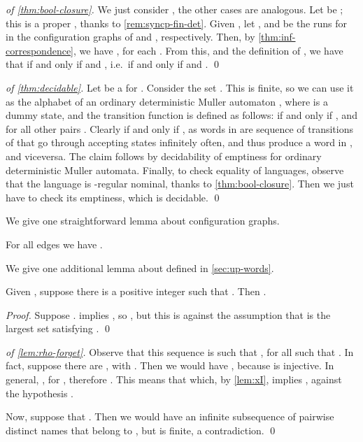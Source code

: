 \begin{proof}[of \cref{thm:bool-closure}]
We just consider , the other cases are analogous. Let  be ; this is a proper \hdma{}, thanks to \cref{rem:syncp-fin-det}. Given , let , and  be the runs for  in the configuration graphs of  and , respectively. Then, by \cref{thm:inf-correspondence}, we have , for each . From this, and the definition of , we have that  if and only if  and , i.e.\  if and only if  and .
\qed
\end{proof}
\begin{proof}[of \cref{thm:decidable}]
Let  be a \hdma{} for . Consider the set . This is finite, so we can use it as the alphabet of an ordinary deterministic Muller automaton , where  is a dummy state, and the transition function is defined as follows:  if and only if , and  for all other pairs . Clearly  if and only if , as words in  are sequence of transitions of  that go through accepting states infinitely often, and thus produce a word in , and viceversa. The claim follows by decidability of emptiness for ordinary deterministic Muller automata. Finally, to check equality of languages, observe that the language  is -regular nominal, thanks to \cref{thm:bool-closure}. Then we just have to check its emptiness, which is decidable.
\qed
\end{proof}
We give one straightforward lemma about configuration graphs.
\begin{lemma}
\label{lem:tr-names}
For all edges  we have .
\end{lemma}
We give one additional lemma about  defined in \cref{sec:up-words}.
\begin{lemma}
\label{lem:xI}
Given , suppose there is a positive integer  such that . Then .
\end{lemma}
\begin{proof}
Suppose .  implies , so , but this is against the assumption that  is the largest set satisfying .
\qed
\end{proof}




\begin{proof}[of \cref{lem:rho-forget}]
Observe that this sequence is such that , for all  such that . In fact, suppose there are , with . Then we would have , because  is injective. In general, , for , therefore . This means that  which, by \cref{lem:xI}, implies , against the hypothesis .

Now, suppose that . Then we would have an infinite subsequence  of pairwise distinct names that belong to , but  is finite, a contradiction.
\qed
\end{proof}


